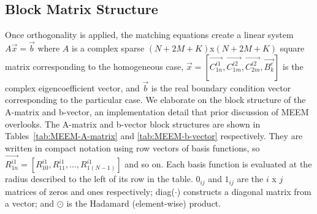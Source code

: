\begin{appendices}
\subsection{Block Matrix Structure}

Once orthogonality is applied, the matching equations create a linear system $A\vec{x}=\vec{b}$ where $A$ is a complex sparse $(N+2M+K)$x$(N+2M+K)$ square matrix corresponding to the homogeneous case, $\vec{x}=[\vec{C_{1n}^{i1}}, \vec{C_{1m}^{i2}}, \vec{C_{2m}^{i2}}, \vec{B_{k}^{e}}]$ is the complex eigencoefficient vector, and $\vec{b}$ is the real boundary condition vector corresponding to the particular case. We elaborate on the block structure of the A-matrix and b-vector, an implementation detail that prior discussion of MEEM overlooks. The A-matrix and b-vector block structures are shown in Tables~\ref{tab:MEEM-A-matrix} and \ref{tab:MEEM-b-vector} respectively. They are written in compact notation using row vectors of basis functions, so $\vec{R_{1n}^{i1}}=[R_{10}^{i1}, R_{11}^{i1}, ..., R_{1(N-1)}^{i1}]$ and so on. Each basis function is evaluated at the radius described to the left of its row in the table. $0_{ij}$ and $1_{ij}$ are the $i$ x $j$ matrices of zeros and ones respectively; diag($\cdot$) constructs a diagonal matrix from a vector; and $\odot$ is the Hadamard (element-wise) product.


\end{appendices}
